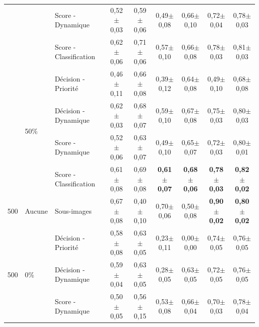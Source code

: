 {\begin{landscape}
\begin{table}[p]
\begin{tabular}{lllcccccc}
							        &                               & Score - Dynamique         & 0,52$\pm$0,03         & 0,59$\pm$0,06         & 0,49$\pm$0,08         & 0,66$\pm$0,10         & 0,72$\pm$0,04         & 0,78$\pm$0,03         \\
							        &                               & Score - Classification    & 0,62$\pm$0,06         & 0,71$\pm$0,06         & 0,57$\pm$0,10         & 0,66$\pm$0,08         & 0,78$\pm$0,03         & 0,81$\pm$0,03         \\ \cline{2-9}
							        & \multirow{4}{*}{50\%}         & Décision - Priorité       & 0,46$\pm$0,11         & 0,66$\pm$0,08         & 0,39$\pm$0,12         & 0,64$\pm$0,08         & 0,49$\pm$0,10         & 0,68$\pm$0,08         \\
							        &                               & Décision - Dynamique      & 0,62$\pm$0,03         & 0,68$\pm$0,07         & 0,59$\pm$0,10         & 0,67$\pm$0,08         & 0,75$\pm$0,03         & 0,80$\pm$0,03         \\
							        &                               & Score - Dynamique         & 0,52$\pm$0,06         & 0,63$\pm$0,07         & 0,49$\pm$0,10         & 0,65$\pm$0,07         & 0,72$\pm$0,03         & 0,80$\pm$0,01         \\ \rowcolor[HTML]{E7E6E6}
		                            &                               & Score - Classification    & 0,61$\pm$0,08         & 0,69$\pm$0,08         & \textbf{0,61$\pm$0,07}& \textbf{0,68$\pm$0,06}& \textbf{0,78$\pm$0,03}& \textbf{0,82$\pm$0,02}\\ \midrule
		500                         & Aucune                        & Sous-images               & 0,67$\pm$0,08         & 0,40$\pm$0,10         & 0,70$\pm$0,06         & 0,50$\pm$0,08         & \textbf{0,90$\pm$0,02}& \textbf{0,80$\pm$0,02}\\ \midrule
		\multirow{12}{*}{500}       & \multirow{4}{*}{0\%}          & Décision - Priorité       & 0,58$\pm$0,08         & 0,63$\pm$0,05         & 0,23$\pm$0,11         & 0,00$\pm$0,00         & 0,74$\pm$0,05         & 0,76$\pm$0,05         \\
							        &                               & Décision - Dynamique      & 0,59$\pm$0,04         & 0,63$\pm$0,05         & 0,28$\pm$0,05         & 0,63$\pm$0,05         & 0,72$\pm$0,05         & 0,76$\pm$0,05         \\
							        &                               & Score - Dynamique         & 0,50$\pm$0,05         & 0,56$\pm$0,15         & 0,53$\pm$0,08         & 0,66$\pm$0,04         & 0,70$\pm$0,03         & 0,78$\pm$0,04         \\

\end{tabular}
\end{table}
\end{landscape}}
